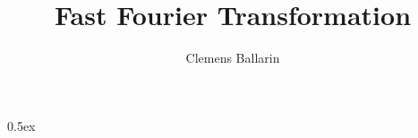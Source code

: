 \documentclass[12pt,a4paper]{article}
\begin{document}
\title{Fast Fourier Transformation }
\author{Clemens Ballarin}
\maketitle

\tableofcontents

\parindent 0pt\parskip 0.5ex


\end{document}
